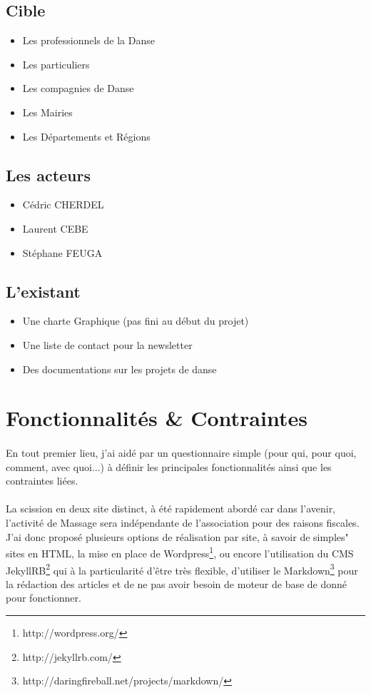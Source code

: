 \documentclass[11pt,a4paper]{report}
\begin{document}
		\subsection{Cible}
			\begin{itemize}
				\item Les professionnels de la Danse
				\item Les particuliers
				\item Les compagnies de Danse
				\item Les Mairies
				\item Les Départements et Régions
			\end{itemize}
		\subsection{Les acteurs}
			\begin{itemize}
				\item Cédric CHERDEL
				\item Laurent CEBE
				\item Stéphane FEUGA
			\end{itemize}
		\subsection{L'existant}
			\begin{itemize}
				\item Une charte Graphique (pas fini au début du projet)
				\item Une liste de contact pour la newsletter
				\item Des documentations sur les projets de danse
			\end{itemize}
	\section{Fonctionnalités \& Contraintes}
		\paragraph*{}En tout premier lieu, j'ai aidé par un questionnaire simple (pour qui, pour quoi, comment, avec quoi...) à définir les principales fonctionnalités ainsi que les contraintes liées.
		\paragraph*{}La scission en deux site distinct, à été rapidement abordé car dans l'avenir, l'activité de Massage sera indépendante de l'association pour des raisons fiscales. J'ai donc proposé plusieurs options de réalisation par site, à savoir de simples" sites en HTML, la mise en place de Wordpress\footnote{http://wordpress.org/}, ou encore l'utilisation du CMS JekyllRB\footnote{http://jekyllrb.com/} qui à la particularité d'être très flexible, d'utiliser le Markdown\footnote{http://daringfireball.net/projects/markdown/} pour la rédaction des articles et de ne pas avoir besoin de moteur de base de donné pour fonctionner.
\end{document}
